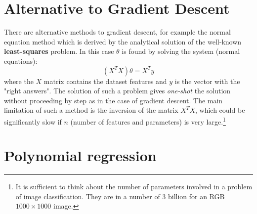 \section{Alternative to Gradient Descent}
There are alternative methods to gradient descent, for example the normal equation method which is derived by the analytical solution of the well-known \textbf{least-squares} problem. In this case $\theta$ is found by solving the system (normal equations):
\begin{equation}
    (X^T X)\theta = X^T{y}
\end{equation}
where the $X$ matrix contains the dataset features and $y$ is the vector with the "right answers". The solution of such a problem gives \textit{one-shot} the solution without proceeding by step as in the case  of gradient descent. The main limitation of such a method is the inversion of the matrix $X^T X$, which could be significantly slow if $n$ (number of features and parameters) is very large.\footnote{
    It is sufficient to think about the number of parameters involved in a problem of image classification. They are in a number of 3 billion for an RGB $1000\times1000$ image. 
}

\section{Polynomial regression}